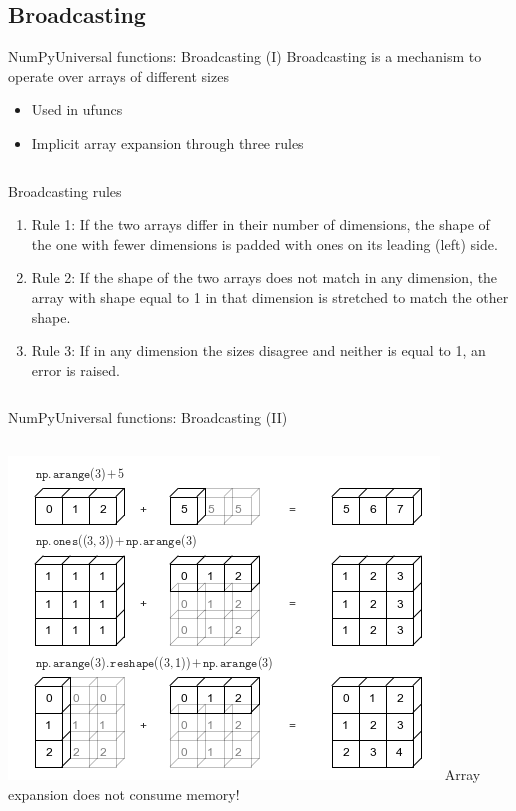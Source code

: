 \documentclass[10pt,compress]{beamer} %
\begin{document}
\subsection{Broadcasting}
\begin{frame}[fragile]{NumPy}{Universal functions: Broadcasting (I)}
	Broadcasting is a mechanism to operate over arrays of different sizes
	\begin{itemize}
		\item Used in ufuncs
		\item Implicit array expansion through three rules
	\end{itemize}
	\vspace{-0.2cm} 
	\begin{columns}
		\begin{block}{\footnotesize{Broadcasting rules}}
		\vspace{-0.2cm} 
		\begin{enumerate}
		\item Rule 1: If the two arrays differ in their number of dimensions, the shape of the one with fewer dimensions is padded with ones on its leading (left) side.
		\item Rule 2: If the shape of the two arrays does not match in any dimension, the array with shape equal to 1 in that dimension is stretched to match the other shape.
		\item Rule 3: If in any dimension the sizes disagree and neither is equal to 1, an error is raised.
		\end{enumerate}
		\vspace{-0.2cm} 
		\end{block}
	\end{columns}
\end{frame}

\begin{frame}[fragile]{NumPy}{Universal functions: Broadcasting (II)}
	\vspace{-0.2cm} 
	\begin{columns}
 	   \column{0.7\textwidth}
		\centering \includegraphics[width=\textwidth]{figs/02.05-broadcasting.png}	
 	   \column{0.3\textwidth}
	   	Array expansion does not consume memory!
	\end{columns}
\end{frame}
\end{document}
